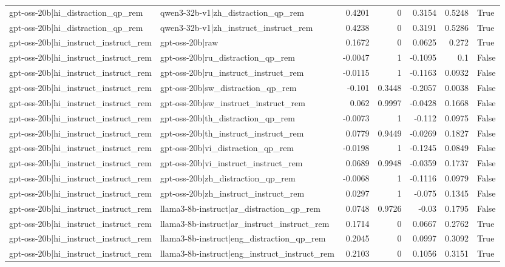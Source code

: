 \begin{table}
\begin{tabular}{l l r r r r l}
gpt-oss-20b|hi_distraction_qp_rem & qwen3-32b-v1|zh_distraction_qp_rem & 0.4201 & 0 & 0.3154 & 0.5248 & True \\
gpt-oss-20b|hi_distraction_qp_rem & qwen3-32b-v1|zh_instruct_instruct_rem & 0.4238 & 0 & 0.3191 & 0.5286 & True \\
gpt-oss-20b|hi_instruct_instruct_rem & gpt-oss-20b|raw & 0.1672 & 0 & 0.0625 & 0.272 & True \\
gpt-oss-20b|hi_instruct_instruct_rem & gpt-oss-20b|ru_distraction_qp_rem & -0.0047 & 1 & -0.1095 & 0.1 & False \\
gpt-oss-20b|hi_instruct_instruct_rem & gpt-oss-20b|ru_instruct_instruct_rem & -0.0115 & 1 & -0.1163 & 0.0932 & False \\
gpt-oss-20b|hi_instruct_instruct_rem & gpt-oss-20b|sw_distraction_qp_rem & -0.101 & 0.3448 & -0.2057 & 0.0038 & False \\
gpt-oss-20b|hi_instruct_instruct_rem & gpt-oss-20b|sw_instruct_instruct_rem & 0.062 & 0.9997 & -0.0428 & 0.1668 & False \\
gpt-oss-20b|hi_instruct_instruct_rem & gpt-oss-20b|th_distraction_qp_rem & -0.0073 & 1 & -0.112 & 0.0975 & False \\
gpt-oss-20b|hi_instruct_instruct_rem & gpt-oss-20b|th_instruct_instruct_rem & 0.0779 & 0.9449 & -0.0269 & 0.1827 & False \\
gpt-oss-20b|hi_instruct_instruct_rem & gpt-oss-20b|vi_distraction_qp_rem & -0.0198 & 1 & -0.1245 & 0.0849 & False \\
gpt-oss-20b|hi_instruct_instruct_rem & gpt-oss-20b|vi_instruct_instruct_rem & 0.0689 & 0.9948 & -0.0359 & 0.1737 & False \\
gpt-oss-20b|hi_instruct_instruct_rem & gpt-oss-20b|zh_distraction_qp_rem & -0.0068 & 1 & -0.1116 & 0.0979 & False \\
gpt-oss-20b|hi_instruct_instruct_rem & gpt-oss-20b|zh_instruct_instruct_rem & 0.0297 & 1 & -0.075 & 0.1345 & False \\
gpt-oss-20b|hi_instruct_instruct_rem & llama3-8b-instruct|ar_distraction_qp_rem & 0.0748 & 0.9726 & -0.03 & 0.1795 & False \\
gpt-oss-20b|hi_instruct_instruct_rem & llama3-8b-instruct|ar_instruct_instruct_rem & 0.1714 & 0 & 0.0667 & 0.2762 & True \\
gpt-oss-20b|hi_instruct_instruct_rem & llama3-8b-instruct|eng_distraction_qp_rem & 0.2045 & 0 & 0.0997 & 0.3092 & True \\
gpt-oss-20b|hi_instruct_instruct_rem & llama3-8b-instruct|eng_instruct_instruct_rem & 0.2103 & 0 & 0.1056 & 0.3151 & True \\

\end{tabular}
\end{table}
